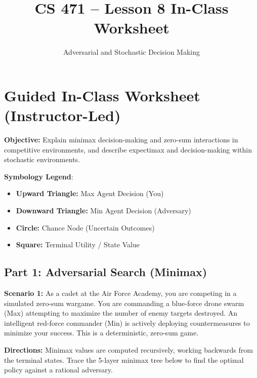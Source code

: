 \documentclass[11pt, letterpaper]{article}
\title{\textbf{CS 471 -- Lesson 8 In-Class Worksheet}}
\author{Adversarial and Stochastic Decision Making}
\date{}
\begin{document}
\maketitle

\section*{Guided In-Class Worksheet (Instructor-Led)}

\textbf{Objective:} Explain minimax decision-making and zero-sum interactions in competitive environments, and describe expectimax and decision-making within stochastic environments.

\vspace{0.5em}
\noindent\textbf{Symbology Legend}:
\begin{itemize}
    \item \textbf{Upward Triangle:} Max Agent Decision (You)
    \item \textbf{Downward Triangle:} Min Agent Decision (Adversary)
    \item \textbf{Circle:} Chance Node (Uncertain Outcomes)
    \item \textbf{Square:} Terminal Utility / State Value
\end{itemize}

\subsection*{Part 1: Adversarial Search (Minimax)}

\noindent\textbf{Scenario 1:} As a cadet at the Air Force Academy, you are competing in a simulated zero-sum wargame. You are commanding a blue-force drone swarm (Max) attempting to maximize the number of enemy targets destroyed. An intelligent red-force commander (Min) is actively deploying countermeasures to minimize your success. This is a deterministic, zero-sum game. 

\vspace{0.5em}
\noindent\textbf{Directions:} Minimax values are computed recursively, working backwards from the terminal states. Trace the 5-layer minimax tree below to find the optimal policy against a rational adversary.
\end{document}
